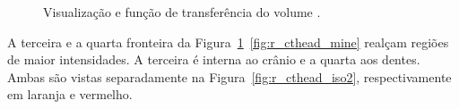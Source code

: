 \begin{figure}[h]
	\centering
	\caption{Visualização e função de transferência do volume .}
	\label{fig:r_cthead}
\end{figure}

	A terceira e a quarta fronteira da Figura~\ref{fig:r_cthead}~\ref{fig:r_cthead_mine} realçam regiões de maior intensidades. A terceira é interna ao crânio e a quarta aos dentes. Ambas são vistas separadamente na Figura~\ref{fig:r_cthead_iso2}, respectivamente em laranja e vermelho.
	
